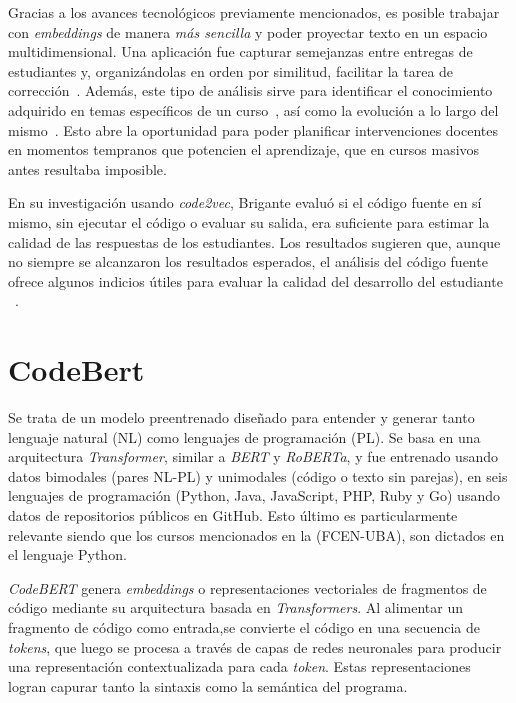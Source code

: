 \documentclass[11pt,a4paper,twoside,openany]{tesis}
\begin{document}
Gracias a los avances tecnológicos previamente mencionados, es posible trabajar con \emph{embeddings} de manera \emph{más sencilla} y poder proyectar texto en un espacio multidimensional. Una aplicación fue capturar semejanzas entre entregas de estudiantes y, organizándolas en orden por similitud, facilitar la tarea de corrección~\cite{simgrade}. Además, este tipo de análisis sirve para identificar el conocimiento adquirido en temas específicos de un curso~\cite{brigante2020evaluation}, así como la evolución a lo largo del mismo~\cite{wu2018zeroshotlearningcode}. Esto abre la oportunidad para poder planificar intervenciones docentes en momentos tempranos que potencien el aprendizaje, que en cursos masivos antes resultaba imposible. 

En su investigación usando \emph{code2vec},  Brigante  evaluó si el código fuente en sí mismo, sin ejecutar el código o evaluar su salida, era suficiente para estimar la calidad de las respuestas de los estudiantes. Los resultados sugieren que, aunque no siempre se alcanzaron los resultados esperados, el análisis del código fuente ofrece algunos indicios útiles para evaluar la calidad del desarrollo del estudiante ~\cite{brigante2020evaluation}.


\section{CodeBert}

Se trata de un modelo preentrenado diseñado para entender y generar tanto lenguaje natural (NL) como lenguajes de programación (PL). Se basa en una arquitectura \emph{Transformer}, similar a \emph{BERT} y \emph{RoBERTa}, y fue entrenado usando datos bimodales (pares NL-PL) y unimodales (código o texto sin parejas), en seis lenguajes de programación (Python, Java, JavaScript, PHP, Ruby y Go) usando datos de repositorios públicos en GitHub. Esto último es particularmente relevante siendo que los cursos mencionados en la (FCEN-UBA), son dictados en el lenguaje Python.

\emph{CodeBERT} genera  \emph{embeddings} o representaciones vectoriales de fragmentos de código mediante su arquitectura basada en \emph{Transformers}. Al alimentar un fragmento de código como entrada,se convierte el código en una secuencia de \emph{tokens}, que luego se procesa a través de capas de redes neuronales para producir una representación contextualizada para cada \emph{token}. Estas representaciones logran capurar tanto la sintaxis como la semántica del programa.
\end{document}
